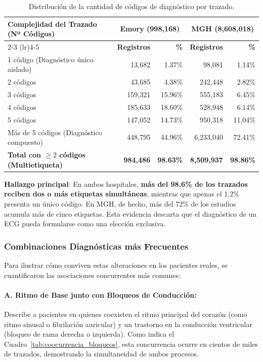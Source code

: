 \documentclass[11pt,a4paper]{article}
\begin{document}
\begin{table}[htbp]
\centering
\small
\renewcommand{\arraystretch}{1.12}
\begin{tabularx}{\textwidth}{@{} X rrrr @{}}
\toprule
\multirow{2}{*}{\textbf{Complejidad del Trazado (Nº Códigos)}} & \multicolumn{2}{c}{\textbf{Emory (998,168)}} & \multicolumn{2}{c}{\textbf{MGH (8,608,018)}} \\
\cmidrule(lr){2-3} \cmidrule(lr){4-5}
& \textbf{Registros} & \textbf{\%} & \textbf{Registros} & \textbf{\%} \\
\midrule
1 código (Diagnóstico único aislado)       &    13,682 &  1.37\% &    98,081 &  1.14\% \\
2 códigos                                  &    43,685 &  4.38\% &   242,448 &  2.82\% \\
3 códigos                                  &   159,321 & 15.96\% &   555,183 &  6.45\% \\
4 códigos                                  &   185,633 & 18.60\% &   528,948 &  6.14\% \\
5 códigos                                  &   147,052 & 14.73\% &   950,318 & 11.04\% \\
Más de 5 códigos (Diagnóstico compuesto)   &   448,795 & 44.96\% & 6,233,040 & 72.41\% \\
\midrule
\textbf{Total con $\ge 2$ códigos (Multietiqueta)} & \textbf{984,486} & \textbf{98.63\%} & \textbf{8,509,937} & \textbf{98.86\%} \\
\bottomrule
\end{tabularx}
\caption{Distribución de la cantidad de códigos de diagnóstico por trazado.}
\label{tab:code_dist}
\end{table}

\textbf{Hallazgo principal}: En ambos hospitales, \textbf{más del 98.6\% de los trazados reciben dos o más etiquetas simultáneas}, mientras que apenas el 1.2\% presenta un único código. En MGH, de hecho, más del 72\% de los estudios acumula más de cinco etiquetas. Esta evidencia descarta que el diagnóstico de un ECG pueda formularse como una elección exclusiva.

\subsubsection{Combinaciones Diagnósticas más Frecuentes}
Para ilustrar cómo conviven estas alteraciones en los pacientes reales, se cuantificaron las asociaciones concurrentes más comunes:

\paragraph{A. Ritmo de Base junto con Bloqueos de Conducción:}
Describe a pacientes en quienes coexisten el ritmo principal del corazón (como ritmo sinusal o fibrilación auricular) y un trastorno en la conducción ventricular (bloqueo de rama derecha o izquierda). Como indica el Cuadro~\ref{tab:coocurrencia_bloqueos}, esta concurrencia ocurre en cientos de miles de trazados, demostrando la simultaneidad de ambos procesos.
\end{document}
